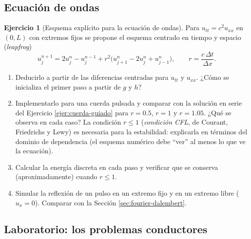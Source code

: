 \documentclass[12pt, a4paper]{amsbook}
\theoremstyle{remark}
\theoremstyle{definition}
\newtheorem{ejer}[teo]{Ejercicio}
\numberwithin{section}{chapter}
\numberwithin{subsection}{section}
\numberwithin{equation}{section}
\numberwithin{figure}{chapter}
\begin{document}
\subsection*{Ecuación de ondas}

\begin{ejer}[Esquema explícito para la ecuación de ondas]\label{lab:leapfrog}
Para $u_{tt} = c^2u_{xx}$ en $(0,L)$ con extremos fijos se propone el esquema centrado en tiempo y espacio (\emph{leapfrog})
$$
u_j^{n+1} = 2u_j^n - u_j^{n-1} + r^2\bigl(u_{j+1}^n - 2u_j^n + u_{j-1}^n\bigr),\qquad r = \frac{c\,\Delta t}{\Delta x}.
$$
\begin{enumerate}
\item Deducirlo a partir de las diferencias centradas para $u_{tt}$ y $u_{xx}$. ¿Cómo se inicializa el primer paso a partir de $g$ y $h$?
\item Implementarlo para una cuerda pulsada y comparar con la solución en serie del Ejercicio \ref{ejer:cuerda-guiado} para $r = 0.5$, $r=1$ y $r=1.05$. ¿Qué se observa en cada caso? La condición $r\le 1$ (\emph{condición CFL}, de Courant, Friedrichs y Lewy) es necesaria para la estabilidad: explicarla en términos del dominio de dependencia (el esquema numérico debe ``ver'' al menos lo que ve la ecuación).
\item Calcular la energía discreta en cada paso y verificar que se conserva (aproximadamente) cuando $r\le 1$.
\item Simular la reflexión de un pulso en un extremo fijo y en un extremo libre ($u_x=0$). Comparar con la Sección \ref{sec:fourier-dalembert}.
\end{enumerate}
\end{ejer}

\subsection*{Laboratorio: los problemas conductores}
\end{document}
